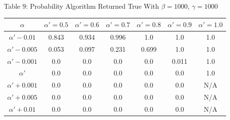 \documentclass{article}
\begin{document}
\begin{center}
Table 9: Probability Algorithm Returned True With $\beta=1000$, $\gamma=1000$ \\
\begin{tabular}{|c|c|c|c|c|c|c|}
\hline
$\alpha$ & $\alpha' = 0.5$ & $\alpha' = 0.6$ & $\alpha' = 0.7$ & $\alpha' = 0.8$ & $\alpha' = 0.9$ & $\alpha' = 1.0$ \\
\hline
$\alpha' -0.01$ & 0.843 & 0.934 & 0.996 & 1.0 & 1.0 & 1.0 \\
\hline
$\alpha'-0.005$ & 0.053 & 0.097 & 0.231 & 0.699 & 1.0 & 1.0 \\
\hline
$\alpha'-0.001$ & 0.0 & 0.0 & 0.0 & 0.0 & 0.011 & 1.0 \\
\hline
$\alpha'$            & 0.0 & 0.0 & 0.0 & 0.0 & 0.0 & 1.0 \\
\hline
$\alpha'+0.001$ & 0.0 & 0.0 & 0.0 & 0.0 & 0.0 & N/A \\
\hline
$\alpha'+0.005$ & 0.0 & 0.0 & 0.0 & 0.0 & 0.0 & N/A \\
\hline
$\alpha'+0.01 $ & 0.0 & 0.0 & 0.0 & 0.0 & 0.0 & N/A \\
\hline
\end{tabular}
\end{center}

\newpage
\end{document}

